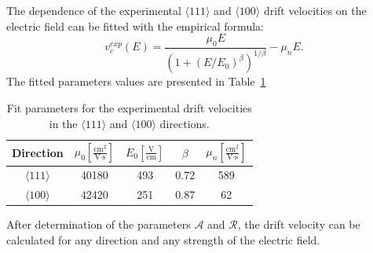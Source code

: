 The dependence of the experimental $\langle111\rangle$ and $\langle100\rangle$ drift velocities on the electric field can be fitted with the empirical formula: 
\begin{equation}
  \label{eq:expe}  
  v_{e}^{exp}(E) = \frac{\mu_{0}E}{(1+(E/E_{0})^{\beta})^{1/\beta}} - \mu_{n}E.
\end{equation}
The fitted parameters values are presented in Table~\ref{tab:pare}
\begin{table}[tbhp]
  \centering
  \begin{tabular}{ccccc}\hline\hline
    Direction & $\mu_{0} \left[ \frac{\mbox{cm}^{2}}{\mbox{V}\cdot\mbox{s}} \right]$ & $E_{0} \left[ \frac{\mbox{V}}{\mbox{cm}} \right]$ & $\beta$ & $\mu_{n} \left[ \frac{\mbox{cm}^{2}}{\mbox{V}\cdot\mbox{s}} \right]$ \\\hline
$\langle111\rangle$ & 40180 & 493 & 0.72 & 589 \\
$\langle100\rangle$ & 42420 & 251 & 0.87 & 62\\ \hline\hline
  \end{tabular}
  \caption{Fit parameters for the experimental drift velocities in the 
$\langle111\rangle$ and $\langle100\rangle$ directions.}
\label{tab:pare}
\end{table}

After determination of the parameters $\mathcal{A}$ and $\mathcal{R}$, the drift velocity can be calculated for any direction and any strength of the electric field.

